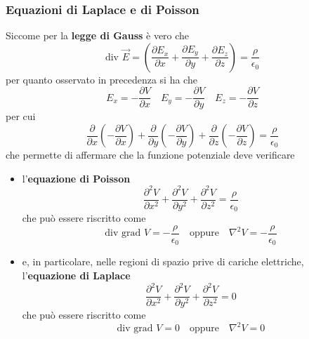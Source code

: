 \documentclass[a4paper]{extarticle}
\begin{document}
\subsubsection{Equazioni di Laplace e di Poisson}
Siccome per la \textbf{legge di Gauss} è vero che
\[\text{div } \vec E = \left(\frac{\partial E_x}{\partial x} + \frac{\partial E_y}{\partial y} + \frac{\partial E_z}{\partial z}\right) = \frac{\rho}{\epsilon_0}\]
per quanto osservato in precedenza si ha che
\[E_x=-\frac{\partial V}{\partial x} \hspace{1em} E_y=-\frac{\partial V}{\partial y} \hspace{1em} E_z=-\frac{\partial V}{\partial z}\]
per cui
\[\frac{\partial}{\partial x} \left(-\frac{\partial V}{\partial x}\right) + \frac{\partial}{\partial y} \left(-\frac{\partial V}{\partial y}\right) + \frac{\partial}{\partial z} \left(-\frac{\partial V}{\partial z}\right) = \frac{\rho}{\epsilon_0}\]
che permette di affermare che la funzione potenziale deve verificare
\begin{itemize}
  \item l'\textbf{equazione di Poisson}
  \[\frac{\partial^2 V}{\partial x^2} + \frac{\partial^2 V}{\partial y^2} + \frac{\partial^2 V}{\partial z^2} = \frac{\rho}{\epsilon_0}\]
  che può essere riscritto come
  \[\text{div grad } V = -\frac{\rho}{\epsilon_0} \hspace{1em} \text{oppure} \hspace{1em} \nabla^2 V = -\frac{\rho}{\epsilon_0}\]

  \item e, in particolare, nelle regioni di spazio prive di cariche elettriche, l'\textbf{equazione di Laplace}
  \[\frac{\partial^2 V}{\partial x^2} + \frac{\partial^2 V}{\partial y^2} + \frac{\partial^2 V}{\partial z^2} = 0\]
  che può essere riscritto come
  \[\text{div grad } V = 0 \hspace{1em} \text{oppure} \hspace{1em} \nabla^2 V = 0\]
\end{itemize}
\end{document}
